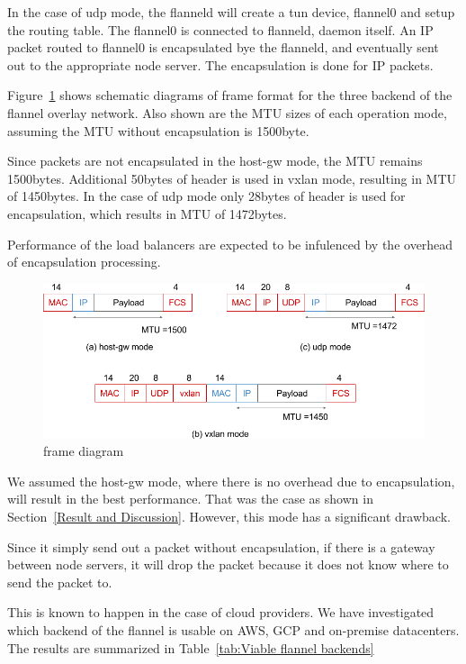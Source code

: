 In the case of udp mode, the flanneld will create a tun device, flannel0 and setup the routing table.
The flannel0 is connected to flanneld, daemon itself.
An IP packet routed to flannel0 is encapsulated bye the flanneld, and eventually sent out 
to the appropriate node server. 
The encapsulation is done for IP packets.

Figure~\ref{fig:flannel-packet-diagram} shows schematic diagrams of frame format for the three backend of 
the flannel overlay network.
Also shown are the MTU sizes of each operation mode, assuming the MTU without encapsulation is 1500byte.

Since packets are not encapsulated in the host-gw mode, the MTU remains 1500bytes.
Additional 50bytes of header is used in vxlan mode, resulting in MTU of 1450bytes.
In the case of udp mode only 28bytes of header is used for encapsulation, which results in MTU of 1472bytes.

Performance of the load balancers are expected to be infulenced by the overhead of encapsulation processing.

\begin{figure}
\includegraphics[width=\columnwidth]{Figs/flannel-packet-diagram}
\caption{frame diagram}
\label{fig:flannel-packet-diagram}
\end{figure}

We assumed the host-gw mode, where there is no overhead due to encapsulation, will result in the best performance.
That was the case as shown in Section~\ref{Result and Discussion}.
However, this mode has a significant drawback.

Since it simply send out a packet without encapsulation, 
if there is a gateway between node servers, 
it will drop the packet because it does not know where to send the packet to.

This is known to happen in the case of cloud providers.  
We have investigated which backend of the flannel is usable on AWS, GCP and on-premise datacenters.
The results are summarized in Table~\ref{tab:Viable flannel backends}

